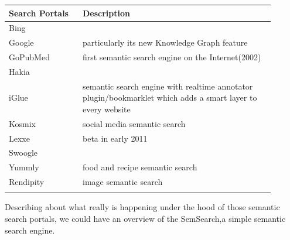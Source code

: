 \documentclass[12pt,a4]{article}
\begin{document}
\begin{tabular}{p{0.25\linewidth}|p{0.65\linewidth}}
  \hline
  Search Portals &Description \\
  \hline
  Bing\\
  Google& particularly its new Knowledge Graph feature\\
  GoPubMed&first semantic search engine on the Internet(2002)\\
  Hakia\\
  iGlue & semantic search engine with realtime annotator plugin/bookmarklet which adds a smart layer to every website\\
  Kosmix & social media semantic search\\
  Lexxe & beta in early 2011\\
  Swoogle\\
  Yummly& food and recipe semantic search\\
  Rendipity & image semantic search\\\\
  \hline
\end{tabular}

Describing about what really is happening under the hood of those semantic search portals, we could have an overview of the SemSearch\cite{semsrch},a simple semantic search engine.
\end{document}
